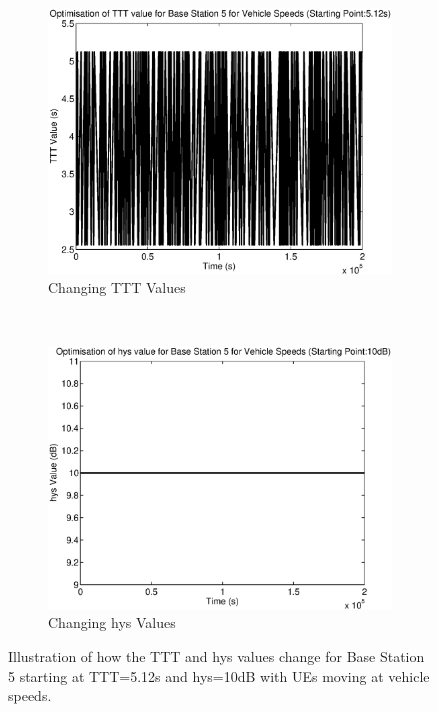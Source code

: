 \begin{figure}[H]
        \centering
        \begin{subfigure}[b]{0.49\textwidth}
                \includegraphics[width=\textwidth]{figures/graphs/vehhigh/TTT5.eps}
                \caption{Changing TTT Values}
        \end{subfigure}%
        ~ %
        \begin{subfigure}[b]{0.49\textwidth}
                \includegraphics[width=\textwidth]{figures/graphs/vehhigh/hys5.eps}
                \caption{Changing hys Values}
        \end{subfigure}
        \caption{Illustration of how the TTT and hys values change for Base Station 5 starting at TTT=5.12s and hys=10dB with UEs moving at vehicle speeds.}
\end{figure}
